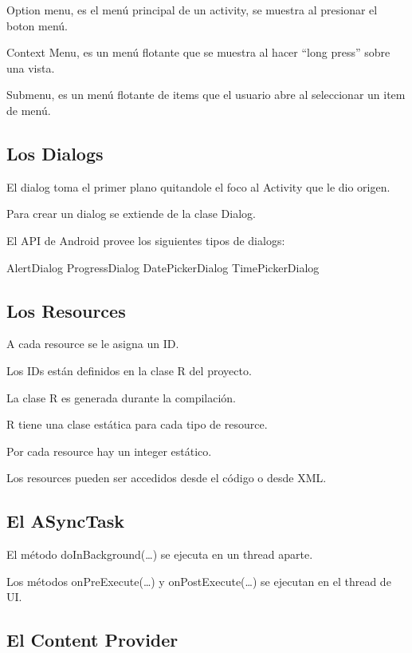 Option menu, es el men\'u principal de un activity, se muestra  al presionar el boton men\'u.

Context Menu, es un men\'u flotante que se muestra al hacer  “long press” sobre una vista.

Submenu, es un men\'u flotante de items que el usuario abre al  seleccionar un item de men\'u.

\subsection{Los Dialogs}
\label{subsec:dev.dialogs}

El dialog toma el primer plano quitandole el foco al Activity  que le dio origen.

Para crear un dialog se extiende de la clase Dialog.

El API de Android provee los siguientes tipos de dialogs:

AlertDialog
ProgressDialog
DatePickerDialog
TimePickerDialog

\subsection{Los Resources}
\label{subsec:dev.resources}

A cada resource se le asigna un ID.

Los IDs est\'an definidos en la clase R del proyecto.

La clase R es generada durante la compilaci\'on.

R tiene una clase est\'atica para cada tipo de resource.

Por cada resource hay un integer est\'atico.

Los resources pueden ser accedidos desde el c\'odigo o desde XML.

\subsection{El ASyncTask}
\label{subsec:dev.asynctask}

El método doInBackground(…) se ejecuta en un thread  aparte.

Los métodos onPreExecute(…)  y onPostExecute(…) se  ejecutan en el thread de UI. 

\subsection{El Content Provider}
\label{subsec:dev.contentProvider}

